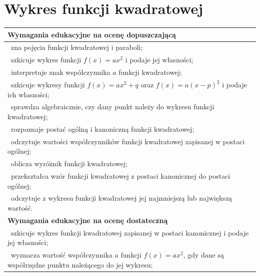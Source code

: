 \documentclass[12pt,a4paper]{article}
\begin{document}
	\section{Wykres funkcji kwadratowej}
	
	\begin{longtable}{|p{16cm}|}
		\hline
		
		\textbf{Wymagania edukacyjne na ocenę dopuszczającą} \\ \hline
		
		\textbullet\ zna pojęcia funkcji kwadratowej i paraboli; \\
		
		\textbullet\ szkicuje wykres funkcji $f(x)=ax^2$ i podaje jej własności; \\
		
		\textbullet\ interpretuje znak współczynnika $a$ funkcji kwadratowej; \\
		
		\textbullet\ szkicuje wykresy funkcji $f(x)=ax^2+q$ oraz $f(x)=a(x-p)^2$ i podaje ich własności; \\
		
		\textbullet\ sprawdza algebraicznie, czy dany punkt należy do wykresu funkcji kwadratowej; \\
		
		\textbullet\ rozpoznaje postać ogólną i kanoniczną funkcji kwadratowej; \\
		
		\textbullet\ odczytuje wartości współczynników funkcji kwadratowej zapisanej w postaci ogólnej; \\
		
		\textbullet\ oblicza wyróżnik funkcji kwadratowej; \\
		
		\textbullet\ przekształca wzór funkcji kwadratowej z postaci kanonicznej do postaci ogólnej; \\
		
		\textbullet\ odczytuje z wykresu funkcji kwadratowej jej najmniejszą lub największą wartość. \\ \hline
		
		\textbf{Wymagania edukacyjne na ocenę dostateczną} \\ \hline
		
		\textbullet\ szkicuje wykres funkcji kwadratowej zapisanej w postaci kanonicznej i podaje jej własności; \\
		
		\textbullet\ wyznacza wartość współczynnika $a$ funkcji $f(x)=ax^2$, gdy dane są współrzędne punktu należącego do jej wykresu; \\
		

\end{longtable}
\end{document}
